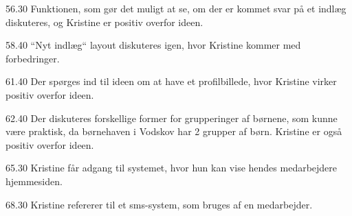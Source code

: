 56.30
Funktionen, som gør det muligt at se, om der er kommet svar på et indlæg diskuteres, og Kristine er positiv overfor ideen. 

58.40
``Nyt indlæg`` layout diskuteres igen, hvor Kristine kommer med forbedringer.

61.40
Der spørges ind til ideen om at have et profilbillede, hvor Kristine virker positiv overfor ideen. 

62.40
Der diskuteres forskellige former for grupperinger af børnene, som kunne være praktisk, da børnehaven i Vodskov har 2 grupper af børn. Kristine er også positiv overfor ideen.

65.30
Kristine får adgang til systemet, hvor hun kan vise hendes medarbejdere hjemmesiden.

68.30
Kristine refererer til et sms-system, som bruges af en medarbejder.






